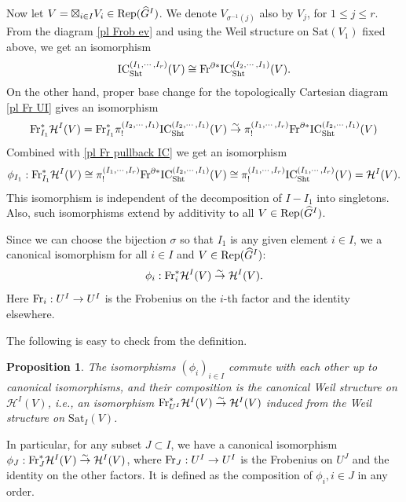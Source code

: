 \documentclass[11pt]{amsart}
\numberwithin{equation}{section}
\theoremstyle{plain}
\newtheorem{prop}[subsubsection]{Proposition}
\theoremstyle{definition}
\newcommand\cH{\mathcal{H}}
\def\dG{\widehat{G}}
\newcommand\Fr{\textup{Fr}}
\newcommand\IC{\textup{IC}}
\newcommand\Rep{\textup{Rep}}
\newcommand\Sht{\textup{Sht}}
\newcommand{\isom}{\stackrel{\sim}{\to}}
\newcommand{\s}{\sigma}
\newcommand{\pl}{\partial}
\newcommand{\Sat}{\mathrm{Sat}}
\begin{document}
Now let $V=\boxtimes_{i\in I}V_{i}\in \Rep(\dG^{I})$. We denote $V_{\s^{-1}(j)}$ also by $V_{j}$, for $1\le j\le r$. From the diagram \eqref{pl Frob ev} and using the Weil structure on $\Sat(V_{1})$ fixed above, we get an isomorphism
\begin{equation}\label{pl Fr pullback IC}
\IC^{(I_{1},\cdots, I_{r})}_{\Sht}(V)\cong \Fr^{\pl*}\IC^{(I_{2},\cdots, I_{1})}_{\Sht}(V).
\end{equation}
On the other hand, proper base change for the topologically Cartesian diagram \eqref{pl Fr UI} gives an isomorphism
\begin{equation*}
\Fr_{I_{1}}^{*}\cH^{I}(V)= \Fr_{I_{1}}^{*}\pi^{(I_{2},\cdots, I_{1})}_{!}\IC^{(I_{2},\cdots, I_{1})}_{\Sht}(V)\isom  \pi^{(I_{1},\cdots, I_{r})}_{!}\Fr^{\pl*}\IC^{(I_{2},\cdots, I_{1})}_{\Sht}(V)
\end{equation*}
Combined with \eqref{pl Fr pullback IC} we get an isomorphism
\begin{equation*}
\phi_{I_{1}}: \Fr_{I_{1}}^{*}\cH^{I}(V)\cong \pi^{(I_{1},\cdots, I_{r})}_{!}\Fr^{\pl*}\IC^{(I_{2},\cdots, I_{1})}_{\Sht}(V)\cong \pi^{(I_{1},\cdots, I_{r})}_{!}\IC^{(I_{1},\cdots, I_{r})}_{\Sht}(V)=\cH^{I}(V).
\end{equation*}
This isomorphism is independent of the decomposition of $I-I_{1}$ into singletons.  Also, such isomorphisms extend by additivity to all $V\in \Rep(\dG^{I})$.

Since we can choose the bijection $\s$ so that $I_{1}$ is any given element $i\in I$, we a canonical isomorphism for all $i\in I$ and $V\in\Rep(\dG^{I})$:
\begin{equation*}
\phi_{i}:  \Fr_{i}^{*}\cH^{I}(V)\isom  \cH^{I}(V).
\end{equation*}
Here $\Fr_{i}: U^{I}\to U^{I}$ is the Frobenius on the $i$-th factor and the identity elsewhere.

The following is easy to check from the definition.
\begin{prop}
The isomorphisms $(\phi_{i})_{i\in I}$ commute with each other up to canonical isomorphisms, and their composition is the canonical Weil structure on $\cH^{I}(V)$, i.e., an isomorphism $\Fr^{*}_{U^{I}}\cH^{I}(V)\isom  \cH^{I}(V)$ induced from the Weil structure on $\Sat_{I}(V)$.
\end{prop}

In particular, for any subset $J\subset I$, we have a canonical isomorphism $\phi_{J}: \Fr_{J}^{*}\cH^{I}(V)\isom  \cH^{I}(V)$, where $\Fr_{J}: U^{I}\to U^{I}$ is the Frobenius on $U^{J}$ and the identity on the other factors. It is defined as the composition of $\phi_{i}, i\in J$ in any order.
\end{document}
